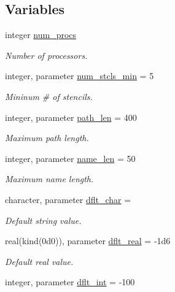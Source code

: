 \subsection*{Variables}
\begin{DoxyCompactItemize}
\item 
integer \hyperlink{namespacem__global__parameters_aafb65952c33f1c363d1040bde29734ea}{num\+\_\+procs}
\begin{DoxyCompactList}\small\item\em Number of processors. \end{DoxyCompactList}\item 
integer, parameter \hyperlink{namespacem__global__parameters_a71f091e6074e6c248fd7e03218b89218}{num\+\_\+stcls\+\_\+min} = 5
\begin{DoxyCompactList}\small\item\em Mininum \# of stencils. \end{DoxyCompactList}\item 
integer, parameter \hyperlink{namespacem__global__parameters_aa9d578c318044b2f2ec990b5fc0dfab9}{path\+\_\+len} = 400
\begin{DoxyCompactList}\small\item\em Maximum path length. \end{DoxyCompactList}\item 
integer, parameter \hyperlink{namespacem__global__parameters_ac8252b115e717c6f1c8595be6f897df7}{name\+\_\+len} = 50
\begin{DoxyCompactList}\small\item\em Maximum name length. \end{DoxyCompactList}\item 
character, parameter \hyperlink{namespacem__global__parameters_ae482a2c5436761ab7b01fc973d64002d}{dflt\+\_\+char} = \textquotesingle{} \textquotesingle{}
\begin{DoxyCompactList}\small\item\em Default string value. \end{DoxyCompactList}\item 
real(kind(0d0)), parameter \hyperlink{namespacem__global__parameters_a99ba7e33a1870ac89386d376e0d20526}{dflt\+\_\+real} = -\/1d6
\begin{DoxyCompactList}\small\item\em Default real value. \end{DoxyCompactList}\item 
integer, parameter \hyperlink{namespacem__global__parameters_a4e4e3806190a62a77cf6542f6d07dbbd}{dflt\+\_\+int} = -\/100

\end{DoxyCompactItemize}
